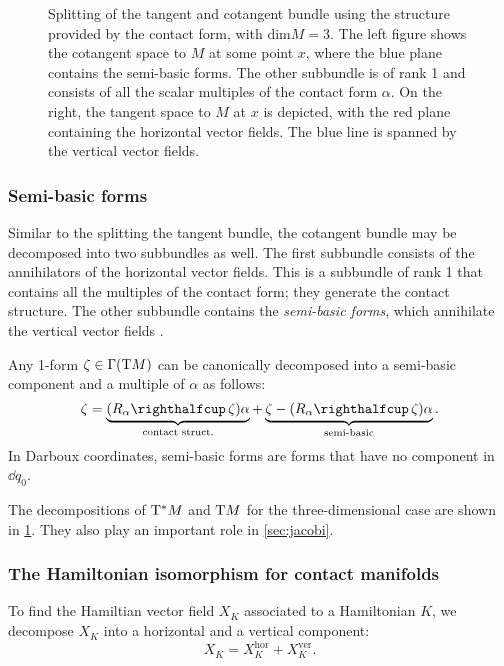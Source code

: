 \begin{figure}[ht!]
    \centering
    
    \caption{Splitting of the tangent and cotangent bundle using the structure provided by the contact form, with \(\text{dim} M = 3\). The left figure shows the cotangent space to \(M\) at some point \(x\), where the blue plane contains the semi-basic forms. The other subbundle is of rank 1 and consists of all the scalar multiples of the contact form \(\alpha\). On the right, the tangent space to \(M\) at \(x\) is depicted, with the red plane containing the horizontal vector fields. The blue line is spanned by the vertical vector fields.}
    \label{fig:contact_spaces}
\end{figure}

\subsubsection{Semi-basic forms} 
Similar to the splitting the tangent bundle, the cotangent bundle may be decomposed into two subbundles as well. The first subbundle consists of the annihilators of the horizontal vector fields. This is a subbundle of rank 1 that contains all the multiples of the contact form; they generate the contact structure. The other subbundle contains the \emph{semi-basic forms}, which annihilate the vertical vector fields \cite{Libermann1987}.

Any 1-form \(\zeta \in \mathrm{\Gamma}\qty(\mathrm{T}M)\) can be canonically decomposed into a semi-basic component and a multiple of \(\alpha\) as follows:
\begin{equation}
    \zeta = \underbrace{(\intpr{R_\alpha}{\zeta})\alpha}_\text{contact struct.} + \underbrace{\zeta - (\intpr{R_\alpha}{\zeta})\alpha}_\text{semi-basic}. 
    \label{eq:form_splitting}
\end{equation}
In Darboux coordinates, semi-basic forms are forms that have no component in \(\dd{q_0}\).

The decompositions of \(\mathrm{T}^*M\) and \(\mathrm{T}M\) for the three-dimensional case are shown in \cref{fig:contact_spaces}. They also play an important role in \cref{sec:jacobi}.

\subsubsection{The Hamiltonian isomorphism for contact manifolds}
To find the Hamiltian vector field \(X_K\) associated to a Hamiltonian \(K\), we decompose \(X_K\) into a horizontal and a vertical component:
\begin{equation}
     X_K = X_K^\text{hor} + X_K^\text{ver}.
\end{equation}

